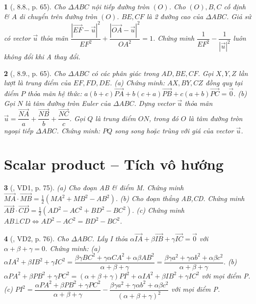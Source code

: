 \documentclass{article}
\newtheorem{baitoan}{}
\begin{document}
\begin{baitoan}[\cite{Hai_Hung_Thu_Tung2022_tap_1}, 8.8., p. 65]
	Cho $\Delta ABC$ nội tiếp đường tròn $(O)$. Cho $(O),B,C$ cố định \& $A$ di chuyển trên đường tròn $(O)$. $BE,CF$ là 2 đường cao của $\Delta ABC$. Giả sử có vector $\vec{u}$ thỏa mãn $\dfrac{|\overrightarrow{EF} - \vec{u}|^2}{EF^2} + \dfrac{|\overrightarrow{OA} - \vec{u}|^2}{OA^2} = 1$. Chứng minh $\dfrac{1}{EF^2} - \dfrac{1}{|\vec{u}|^2}$ luôn không đổi khi A thay đổi.
\end{baitoan}

\begin{baitoan}[\cite{Hai_Hung_Thu_Tung2022_tap_1}, 8.9., p. 65]
	Cho $\Delta ABC$ có các phân giác trong $AD,BE,CF$. Gọi $X,Y,Z$ lần lượt là trung điểm của $EF,FD,DE$. (a) Chứng minh: $AX,BY,CZ$ đồng quy tại điểm $P$ thỏa mãn hệ thức: $a(b + c)\overrightarrow{PA} + b(c + a)\overrightarrow{PB} + c(a + b)\overrightarrow{PC} = \vec{0}$. (b) Gọi $N$ là tâm đường tròn Euler của $\Delta ABC$. Dựng vector $\vec{u}$ thỏa mãn $\vec{u} = \dfrac{\overrightarrow{NA}}{a} + \dfrac{\overrightarrow{NB}}{b} + \dfrac{\overrightarrow{NC}}{c}$. Gọi $Q$ là trung điểm $ON$, trong đó $O$ là tâm đường tròn ngoại tiếp $\Delta ABC$. Chứng minh: $PQ$ song song hoặc trùng với giá của vector $\vec{u}$.
\end{baitoan}


\section{Scalar product -- Tích vô hướng}

\begin{baitoan}[\cite{Hai_Hung_Thu_Tung2022_tap_1}, VD1, p. 75]
	(a) Cho đoạn AB \& điểm M. Chứng minh $\overrightarrow{MA}\cdot\overrightarrow{MB} = \frac{1}{2}(MA^2 + MB^2 - AB^2)$. (b) Cho đoạn thẳng AB,CD. Chứng minh $\overrightarrow{AB}\cdot\overrightarrow{CD} = \frac{1}{2}(AD^2 - AC^2 + BD^2 - BC^2)$. (c) Chứng minh $AB\bot CD\Leftrightarrow AD^2 - AC^2 = BD^2 - BC^2$.
\end{baitoan}

\begin{baitoan}[\cite{Hai_Hung_Thu_Tung2022_tap_1}, VD2, p. 76]
	Cho $\Delta ABC$. Lấy I thỏa $\alpha\overrightarrow{IA} + \beta\overrightarrow{IB} + \gamma\overrightarrow{IC} = \vec{0}$ với $\alpha + \beta + \gamma = 0$. Chứng minh: (a) $\alpha IA^2 + \beta IB^2 + \gamma IC^2 = \dfrac{\beta\gamma BC^2 + \gamma\alpha CA^2 + \alpha\beta AB^2}{\alpha + \beta + \gamma} = \dfrac{\beta\gamma a^2 + \gamma\alpha b^2 + \alpha\beta c^2}{\alpha + \beta + \gamma}$. (b) $\alpha PA^2 + \beta PB^2 + \gamma PC^2 = (\alpha + \beta + \gamma)PI^2 + \alpha IA^2 + \beta IB^2 + \gamma IC^2$ với mọi điểm P. (c) $PI^2 = \dfrac{\alpha PA^2 + \beta PB^2 + \gamma PC^2}{\alpha + \beta + \gamma} - \dfrac{\beta\gamma a^2 + \gamma\alpha b^2 + \alpha\beta c^2}{(\alpha + \beta + \gamma)^2}$ với mọi điểm P.
\end{baitoan}
\end{document}
